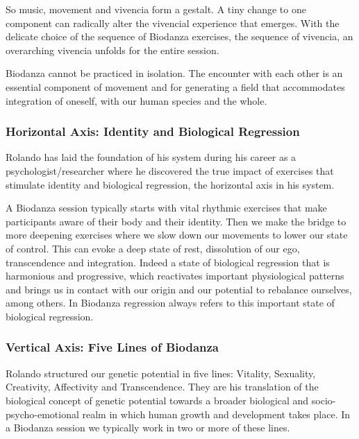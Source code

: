 \documentclass[
  11pt,
]{book}
\begin{document}
So music, movement and vivencia form a gestalt. A tiny change to one component can radically alter the vivencial experience that emerges.
With the delicate choice of the sequence of Biodanza exercises, the sequence of vivencia, an overarching vivencia unfolds for the entire session.

Biodanza cannot be practiced in isolation. The encounter with each other is an essential component of movement and for generating a field that accommodates integration of oneself, with our human species and the whole.

\hypertarget{horizontal-axis-identity-and-biological-regression}{%
\subsubsection{Horizontal Axis: Identity and Biological Regression}\label{horizontal-axis-identity-and-biological-regression}}

Rolando has laid the foundation of his system during his career as a psychologist/researcher where he discovered the true impact of exercises that stimulate identity and biological regression, the horizontal axis in his system.

A Biodanza session typically starts with vital rhythmic exercises that make participants aware of their body and their identity.
Then we make the bridge to more deepening exercises where we slow down our movements to lower our state of control. This can evoke a deep state of rest, dissolution of our ego, transcendence and integration. Indeed a state of biological regression that is harmonious and progressive, which reactivates important physiological patterns and brings us in contact with our origin and our potential to rebalance ourselves, among others. In Biodanza regression always refers to this important state of biological regression.

\hypertarget{vertical-axis-five-lines-of-biodanza}{%
\subsubsection{Vertical Axis: Five Lines of Biodanza}\label{vertical-axis-five-lines-of-biodanza}}

Rolando structured our genetic potential in five lines: Vitality, Sexuality, Creativity, Affectivity and Transcendence. They are his translation of the biological concept of genetic potential towards a broader biological and socio-psycho-emotional realm in which human growth and development takes place.
In a Biodanza session we typically work in two or more of these lines.
\end{document}
